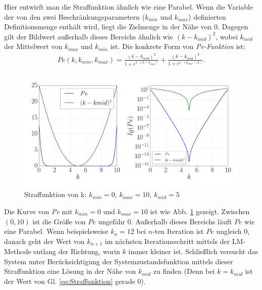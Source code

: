 Hier entwirft man die Straffunktion ähnlich wie eine Parabel. Wenn die Variable der von den zwei Beschränkungsparametern ($k_{min}$ und $k_{max}$) definierten Definitionsmenge enthält wird, liegt die Zielmenge in der Nähe von 0. Dagegen gilt der Bildwert außerhalb dieses Bereichs ähnlich wie $(k-k_{mid})^{2}$, wobei $k_{mid}$ der Mittelwert von $k_{max}$ und $k_{min}$ ist. Die konkrete Form von \emph{Pe-Funktion} ist:
\begin{eqnarray}
Pe(k,k_{min},k_{max}) = \frac{(k-k_{mid})^{2}}{1 + e^{5\cdot (k-k_{min})}} + \frac{(k-k_{mid})^{2}}{1 + e^{5\cdot (k_{max}-k)}}.\label{eq:Straffunktion}     
\end{eqnarray}

\begin{figure}[!h]
	\centering
	\includegraphics[width=0.7\linewidth]{bild/pe/test0_Gutefunction.pdf}%
	\caption[Straffunktion von k.]{Straffunktion von k: $k_{min}=0$, $k_{max}=10$, $k_{mid}=5$}
	\label{fig:Straffunktion_pe}
\end{figure}
Die Kurve von \emph{Pe} mit $k_{min}=0$ und $k_{max}=10$ ist wie Abb. \ref{fig:Straffunktion_pe} gezeigt. Zwischen $(0,10)$ ist die Größe von $Pe$ ungefähr 0. Außerhalb dieses Bereichs läuft $Pe$ wie eine Parabel. Wenn beispielsweise $k_{n}=12$ bei $n$-ten Iteration ist $Pe$ ungleich $0$, danach geht der Wert von $k_{n+1}$ im nächsten Iterationsschritt mittels der LM-Methode entlang der Richtung, worin $k$ immer kleiner ist. Schließlich versucht das System unter Berücksichtigung der Systemzustandsfunktion mittels dieser Straffunktion eine Lösung in der Nähe von $k_{mid}$ zu finden (Denn bei $k=k_{mid}$ ist der Wert von Gl. \eqref{eq:Straffunktion} gerade $0$).

